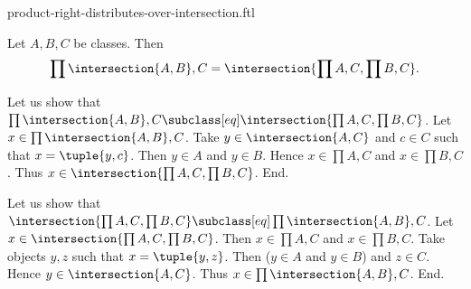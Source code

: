 \documentclass{article}
\begin{document}
\begin{smodule}[creators={Marcel Schütz}]{product-right-distributes-over-intersection.ftl}

  \begin{fproposition*}[label=6227653050761216]
    Let $A, B, C$ be classes.
    Then \[\prod{\intersection{A,B},C} = \intersection{\prod{A,C},\prod{B,C}}.\]
  \end{fproposition*}
  \begin{fproof}
    Let us show that $\prod{\intersection{A,B},C} \subclass[eq] \intersection{\prod{A,C},\prod{B,C}}$.
      Let $x \in \prod{\intersection{A,B},C}$.
      Take $y \in \intersection{A,C}$ and $c \in C$ such that $x = \tuple{y,c}$.
      Then $y \in A$ and $y \in B$.
      Hence $x \in \prod{A,C}$ and $x \in \prod{B,C}$.
      Thus $x \in \intersection{\prod{A,C},\prod{B,C}}$.
    End.

    Let us show that $\intersection{\prod{A,C},\prod{B,C}} \subclass[eq] \prod{\intersection{A,B},C}$.
      Let $x \in \intersection{\prod{A,C},\prod{B,C}}$.
      Then $x \in \prod{A,C}$ and $x \in \prod{B,C}$.
      Take objects $y, z$ such that $x = \tuple{y,z}$.
      Then ($y \in A$ and $y \in B$) and $z \in C$.
      Hence $y \in \intersection{A,C}$.
      Thus $x \in \prod{\intersection{A,B},C}$.
    End.
  \end{fproof}
\end{smodule}
\end{document}

